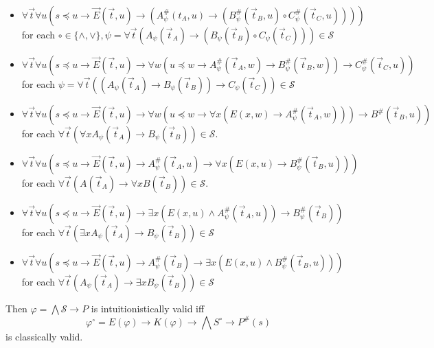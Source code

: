 \documentclass[a4paper,UKenglish,cleveref, autoref, thm-restate]{lipics-v2021}
\begin{document}
\begin{itemize}
	\item $\forall \vec t\forall u(s\preceq u\to\vec E(\vec t, u)\to (A_\psi^\#(t_A, u)\to (B_\psi^\#(\vec t_B, u)\circ C_\psi^\#(\vec t_C, u))))$\\for each $\circ\in\{\wedge, \vee\}, \psi = \forall \vec t(A_\psi(\vec t_A)\to (B_\psi(\vec t_B)\circ C_\psi(\vec t_C)))\in\mathcal S$
	\item $\forall \vec t\forall u(s\preceq u\to\vec E(\vec t, u)\to \forall w(u\preceq w\to A_\psi^\#(\vec t_A, w)\to B_\psi^\#(\vec t_B, w))\to C_\psi^\#(\vec t_C, u))$ for each $\psi = \forall \vec t((A_\psi(\vec t_A)\to B_\psi(\vec t_B))\to C_\psi(\vec t_C))\in\mathcal S$
	\item  $\forall \vec t\forall u(s\preceq u\to\vec E(\vec t, u)\to \forall w(u\preceq w\to \forall x(E(x, w)\to A_\psi^\#(\vec t_A, w)))\to B^\#(\vec t_B, u))$ for each $\forall \vec t(\forall xA_\psi(\vec t_A)\to B_\psi(\vec t_B))\in\mathcal S$.
	\item $\forall \vec t\forall u(s\preceq u\to\vec E(\vec t, u)\to A^\#_\psi(\vec t_A, u)\to \forall x(E(x, u)\to B^\#_\psi(\vec t_B, u)))$\\for each $\forall \vec t(A(\vec t_A)\to \forall xB(\vec t_B))\in\mathcal S$.
	\item $\forall \vec t\forall u(s\preceq u\to\vec E(\vec t, u)\to \exists x(E(x, u)\wedge A^\#_\psi(\vec t_A, u))\to B^\#_\psi(\vec t_B))$\\for each $\forall \vec t(\exists xA_\psi(\vec t_A)\to B_\psi(\vec t_B))\in\mathcal S$
	\item $\forall \vec t\forall u(s\preceq u\to\vec E(\vec t, u)\to A^\#_\psi(\vec t_B)\to \exists x(E(x, u)\wedge B^\#_\psi(\vec t_B, u)))$\\for each $\forall \vec t(A_\psi(\vec t_A)\to \exists xB_\psi(\vec t_B))\in\mathcal S$
\end{itemize}
Then $\varphi = \bigwedge\mathcal S\to P$ is intuitionistically valid iff
$$\varphi^\circ= E(\varphi)\to K(\varphi)\to \bigwedge S^\circ\to P^\#(s)$$
is classically valid.
\end{document}
